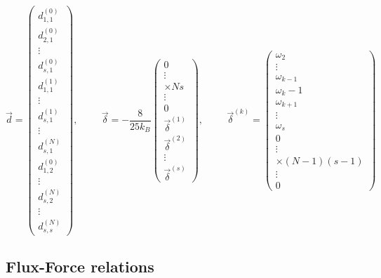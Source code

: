 \begin{equation}
    \Vec{d} = 
    \begin{pmatrix}
        d_{1, 1}^{(0)} \\ d_{2, 1}^{(0)} \\ \vdots \\ d_{s, 1}^{(0)} \\ d_{1, 1}^{(1)} \\ \vdots \\ d_{s, 1}^{(1)} \\ \vdots \\ d_{s, 1}^{(N)} \\ d_{1, 2}^{(0)} \\ \vdots \\ d_{s, 2}^{(N)} \\ \vdots \\ d_{s, s}^{(N)}
    \end{pmatrix}
    , \hspace{1cm}
    \Vec{\delta} = - \frac{8}{25 k_B}
    \begin{pmatrix}
        0 \\ \vdots \\ \times Ns \\ \vdots \\ 0 \\ \Vec{\delta}^{(1)} \\ \Vec{\delta}^{(2)} \\ \vdots \\ \Vec{\delta}^{(s)}
    \end{pmatrix}, \hspace{1cm}
    \Vec{\delta}^{(k)} = 
    \begin{pmatrix}
        \omega_2 \\ \vdots \\ \omega_{k-1} \\ \omega_k - 1 \\ \omega_{k+1} \\ \vdots \\ \omega_s \\ 0 \\ \vdots \\ \times (N-1)(s-1) \\ \vdots \\ 0
    \end{pmatrix}
\end{equation}

\subsection{Flux-Force relations}

